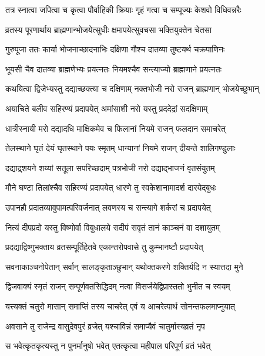 \twolineshloka
{तत्र स्नात्वा जपित्वा च कृत्वा पौर्वाहिकी क्रियाः}
{गृहं गत्वा च सम्पूज्यः केशवो विधिवन्नरैः} %

\twolineshloka
{व्रतस्य पूरणार्थाय ब्राह्मणान्भोजयेत्सुधीः}
{क्षमापयेत्सुवचसा भक्तियुक्तेन चेतसा} %

\twolineshloka
{गुरुपूजा ततः कार्या भोजनाच्छादनाभिः}
{दक्षिणा गौश्च दातव्या तुष्टयर्थ चक्रपाणिनः} %

\twolineshloka
{भूयसी चैव दातव्या ब्राह्मणेभ्यः प्रयत्नतः}
{नियमश्चैव सन्त्याज्यो ब्राह्मणाने प्रयत्नतः} %

\twolineshloka
{कथयित्वा द्विजेभ्यस्तु दद्याच्छक्त्या च दक्षिणाम्}
{नक्तभोजी नरो राजन् ब्राह्मणान् भोजयेच्छुभान्} %

\twolineshloka
{अयाचिते बलीव सहिरण्यं प्रदापयेत्}
{अमांसाशी नरो यस्तु प्रददेद्रां सदक्षिणाम्} %

\twolineshloka
{धात्रीस्नायी मरो दद्यादधि माक्षिकमेव च}
{फिलानां नियमे राजन् फलदान समाचरेत्} %

\twolineshloka
{तेलस्थाने घृतं देयं घृतस्थाने पयः स्मृतम्}
{धान्यानां नियमे राजन् दीयन्ते शालिगण्डुलाः} %

\twolineshloka
{दद्याद्र्शयने शय्यां सतूला सपरिच्छदाम्}
{पत्रभोजी नरो दद्याद्भाजनं वृतसंयुतम्} %

\twolineshloka
{मौने घण्टा तिलांश्चैव सहिरण्यं प्रदापयेत्}
{धारणे तु स्वकेशानामादर्श दारयेद्बुधः} %

\twolineshloka
{उपानहौ प्रदातव्यावुपामत्परिवर्जनात्}
{लवणस्य च सन्त्यागे शर्करां च प्रदापयेत्} %

\twolineshloka
{नित्यं दीपप्रदो यस्तु विष्णोर्वा विबुधालये}
{सदीपं सवृतं तानं काञ्चनं वा दशायुतम्} %

\twolineshloka
{प्रदद्याद्विष्णुभक्ताय व्रतसम्पूर्तिहेतवे}
{एकान्तरोपवासे तु कुम्भानष्टौ प्रदापयेत्} %

\twolineshloka
{सवनाकाञ्चनोपेतान् सर्वान् सालङ्कृताञ्छुभान्}
{यथोक्तकरणे शक्तिर्यदि न स्यात्तदा मुने} %

\twolineshloka
{द्विजवाक्यं स्मृतं राजन् सम्पूर्णवतसिद्धिदम्}
{नत्वा विसर्जयेद्विप्रास्ततो भुनीत च स्वयम्} %

\twolineshloka
{यत्त्यक्तं चतुरो मासान् समाप्तिं तस्य चाचरेत्}
{एवं य आचरेत्पार्थ सोनन्तफलमाप्नुयात्} %

\twolineshloka
{अवसाने तु राजेन्द्र वासुदेवपुरं व्रजेत्}
{यश्चाविन्नं समाप्यैवं चातुर्मास्यव्रतं नृप} %

\twolineshloka
{स भवेत्कृतकृत्यस्तु न पुनर्मानुषो भवेत्}
{एतत्कृत्वा महीपाल परिपूर्ण व्रतं भवेत्} %

